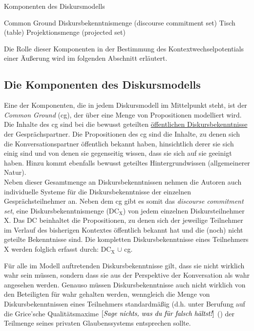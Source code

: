 \begin{exe}
	\ex\label{227} 
		Komponenten des Diskursmodells
		\begin{xlist}	
			\ex\label{227a} Common Ground 
			\ex\label{227b} Diskursbekenntnismenge (discourse commitment set) 
			\ex\label{227c} Tisch (table)	
			\ex\label{227d} Projektionsmenge (projected set) 
		\end{xlist}
\end{exe}
Die Rolle dieser Komponenten in der Bestimmung des Kontextwechselpotentials einer Äußerung wird im folgenden Abschnitt erläutert.

\subsection{Die Komponenten des Diskursmodells}
Eine der Komponenten, die in jedem Diskursmodell im Mittelpunkt steht, ist der \textit{Common Ground} (cg), der über eine Menge von Propositionen modelliert wird. Die Inhalte des cg sind bei \citet{Farkas2010} die bewusst geteilten \underline{öffentlichen Diskursbekenntnisse} der Gesprächspartner. Die Propositionen des cg sind die Inhalte, zu denen sich die Konversationspartner öffentlich bekannt haben, hinsichtlich derer sie sich einig sind und von denen sie gegenseitig wissen, dass sie sich auf sie geeinigt haben. Hinzu kommt ebenfalls bewusst geteiltes Hintergrundwissen (allgemeine\-rer Natur).\\

\noindent 
Neben dieser Gesamtmenge an Diskursbekenntnissen nehmen die Autoren auch individuelle Systeme für die Diskursbekenntnisse der einzelnen Gesprächs\-teilnehmer an. Neben dem cg gibt es somit das \textit{discourse commitment set}, eine Diskursbekenntnismenge  ($\textrm{DC}_{\textrm{X}}$) von jedem einzelnen Diskursteilnehmer X. Das DC beinhaltet die Propositionen, zu denen sich der jeweilige Teilnehmer im Verlauf des bisherigen Kontextes öffentlich bekannt hat und die (noch) nicht geteilte Bekenntnisse sind. Die kompletten Diskursbekenntnisse eines Teilnehmers X werden folglich erfasst durch: $\textrm{DC}_{\textrm{X}}$ $\cup$ cg.

Für alle im Modell auftretenden Diskursbekenntnisse gilt, dass sie nicht wirklich wahr sein müssen, sondern dass sie aus der Perspektive der Konversation als wahr angesehen werden. Genauso müssen Diskursbekenntnisse auch nicht wirklich von den Beteiligten für wahr gehalten werden, wenngleich die Menge von Diskursbekenntnissen eines Teilnehmers standardmäßig (d.h. unter Berufung auf die Grice'sche Qualitätsmaxime  $[\textit{\textrm{Sage nichts, was du für falsch hältst!}}]$ (\citealt{Grice1989}) der Teilmenge seines privaten Glaubenssystems entsprechen sollte.


